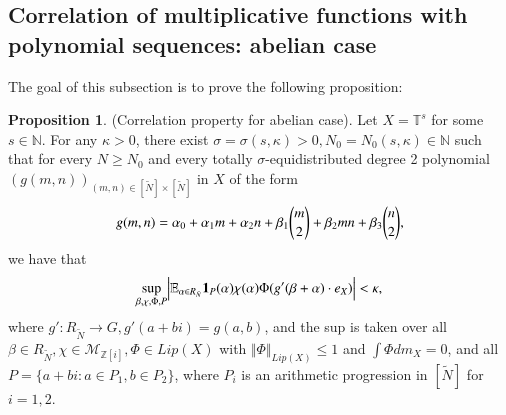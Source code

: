 \documentclass[12pt,amstex]{amsart}
\theoremstyle{definition}
\newtheorem{prop}[thm]{Proposition}
\def \Z {\mathbb{Z}[i]}
\def \A {\alpha}
\def \B {\beta}
\def \D {\kappa}
\def \R {R_{\tilde{N}}}
\begin{document}
\subsection{Correlation of multiplicative functions with polynomial sequences: abelian case}
The goal of this subsection is to prove the following proposition:
\begin{prop}\label{est2}(Correlation property for abelian case). Let $X=\mathbb{T}^{s}$ for some $s\in\mathbb{N}$.
  For any $\D>0$, there exist $\sigma=\sigma(s,\D)>0,N_{0}=N_{0}(s,\D)\in\mathbb{N}$ such that for every $N\geq N_{0}$ and every totally $\sigma$-equidistributed degree 2 polynomial $(g(m,n))_{(m,n)\in[\tilde{N}]\times[\tilde{N}]}$ in $X$ of the form
  \begin{equation}\nonumber
  \begin{split}
    g(m,n)=\bold{\A}_{0}+\bold{\A}_{1}m+\bold{\A}_{2}n+\bold{\B}_{1}\binom{m}{2}+\bold{\B}_{2}mn+\bold{\B}_{3}\binom{n}{2},
  \end{split}
  \end{equation}
we have that
  \begin{equation}\nonumber
  \begin{split}
    \sup_{\B,\chi,\Phi,P}\Bigl\vert\mathbb{E}_{\A\in \R}\bold{1}_{P}(\A)\chi(\A)\Phi(g'(\B+\A)\cdot e_{X})\Bigr\vert<\D,
  \end{split}
  \end{equation}
  where $g'\colon \R\rightarrow G, g'(a+bi)=g(a,b)$, and the sup is taken over all $\B\in \R, \chi\in\mathcal{M}_{\Z}, \Phi\in Lip(X)$ with $\Vert\Phi\Vert_{Lip(X)}\leq 1$ and $\int\Phi dm_{X}=0$, and all $P=\{a+bi\colon a\in P_{1}, b\in P_{2}\}$, where $P_{i}$ is an arithmetic progression in $[\tilde{N}]$ for $i=1,2$.
\end{prop}
\end{document}
